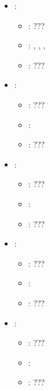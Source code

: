 \begin{itemize}
    \item {}:
           \begin{itemize}
                \item \optionPossibleValues{}: ???
                \item \optionDefaultValue{}: , , , 
                \item \optionDescrption{}: ???
           \end{itemize}
    \item {}:
           \begin{itemize}
                \item \optionPossibleValues{}: ???
                \item \optionDefaultValue{}: 
                \item \optionDescrption{}: ???
           \end{itemize}
    \item {}:
           \begin{itemize}
                \item \optionPossibleValues{}: ???
                \item \optionDefaultValue{}: 
                \item \optionDescrption{}: ???
           \end{itemize}
    \item {}:
           \begin{itemize}
                \item \optionPossibleValues{}: ???
                \item \optionDefaultValue{}: 
                \item \optionDescrption{}: ???
           \end{itemize}
    \item {}:
           \begin{itemize}
                \item \optionPossibleValues{}: ???
                \item \optionDefaultValue{}: 
                \item \optionDescrption{}: ???

\end{itemize}
\end{itemize}
